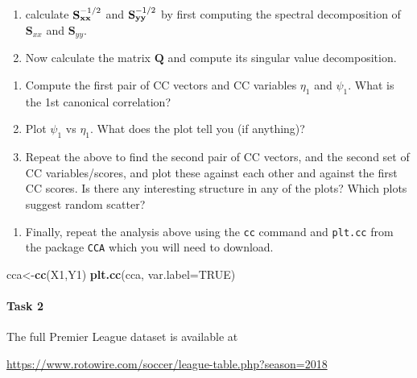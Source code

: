 \documentclass[
]{book}
\newenvironment{Shaded}{\begin{snugshade}}{\end{snugshade}}
\newcommand{\AttributeTok}[1]{\textcolor[rgb]{0.13,0.29,0.53}{#1}}
\newcommand{\ConstantTok}[1]{\textcolor[rgb]{0.56,0.35,0.01}{#1}}
\newcommand{\FunctionTok}[1]{\textcolor[rgb]{0.13,0.29,0.53}{\textbf{#1}}}
\newcommand{\NormalTok}[1]{#1}
\newcommand{\OtherTok}[1]{\textcolor[rgb]{0.56,0.35,0.01}{#1}}
\providecommand{\tightlist}{%
  \setlength{\itemsep}{0pt}\setlength{\parskip}{0pt}}
\theoremstyle{definition}
\theoremstyle{definition}
\theoremstyle{definition}
\theoremstyle{definition}
\theoremstyle{remark}
\begin{document}
\begin{enumerate}
\def\labelenumi{\roman{enumi}.}
\item
  calculate \({\bf S}_{\bf x x}^{-1/2}\) and \({\bf S}_{\bf yy}^{-1/2}\) by first computing the spectral decomposition of \(\mathbf S_{xx}\) and \(\mathbf S_{yy}\).
\item
  Now calculate the matrix \(\mathbf Q\) and compute its singular value decomposition.
\end{enumerate}

\begin{enumerate}
\def\labelenumi{\roman{enumi}.}
\setcounter{enumi}{2}
\item
  Compute the first pair of CC vectors and CC variables \(\eta_1\) and \(\psi_1\). What is the 1st canonical correlation?
\item
  Plot \(\psi_1\) vs \(\eta_1\). What does the plot tell you (if anything)?
\item
  Repeat the above to find the second pair of CC vectors, and the second set of CC variables/scores, and plot these against each other and against the first CC scores. Is there any interesting structure in any of the plots? Which plots suggest random scatter?
\end{enumerate}

\begin{enumerate}
\def\labelenumi{\roman{enumi}.}
\setcounter{enumi}{5}
\tightlist
\item
  Finally, repeat the analysis above using the \texttt{cc} command and \texttt{plt.cc} from the package \texttt{CCA} which you will need to download.
\end{enumerate}

\begin{Shaded}
\begin{Highlighting}[]
\NormalTok{cca}\OtherTok{\textless{}{-}}\FunctionTok{cc}\NormalTok{(X1,Y1)}
\FunctionTok{plt.cc}\NormalTok{(cca, }\AttributeTok{var.label=}\ConstantTok{TRUE}\NormalTok{)}
\end{Highlighting}
\end{Shaded}

\hypertarget{task-2}{%
\paragraph*{Task 2}\label{task-2}}

The full Premier League dataset is available at

\href{https://www.rotowire.com/soccer/league-table.php?season=2019}{https://www.rotowire.com/soccer/league-table.php?season=2018}
\end{document}
